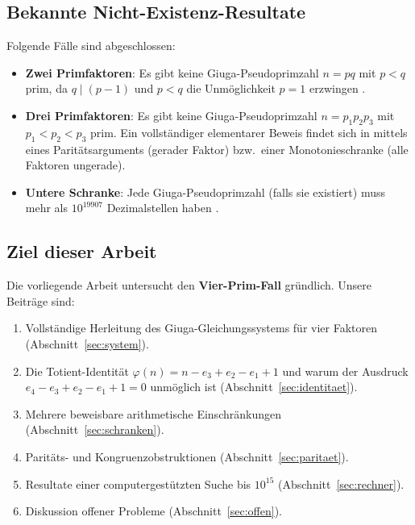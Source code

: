 \documentclass[12pt,a4paper]{amsart}
\theoremstyle{definition}
\begin{document}
\subsection{Bekannte Nicht-Existenz-Resultate}

Folgende Fälle sind abgeschlossen:

\begin{itemize}
  \item \textbf{Zwei Primfaktoren}: Es gibt keine Giuga-Pseudoprimzahl
        $n = pq$ mit $p < q$ prim, da $q \mid (p-1)$ und $p < q$ die
        Unmöglichkeit $p = 1$ erzwingen \cite{Borwein1996}.
  \item \textbf{Drei Primfaktoren}: Es gibt keine Giuga-Pseudoprimzahl
        $n = p_1 p_2 p_3$ mit $p_1 < p_2 < p_3$ prim.  Ein vollständiger
        elementarer Beweis findet sich in \cite{FuhrmannPaper1} mittels
        eines Paritätsarguments (gerader Faktor) bzw.\ einer
        Monotonieschranke (alle Faktoren ungerade).
  \item \textbf{Untere Schranke}: Jede Giuga-Pseudoprimzahl (falls sie
        existiert) muss mehr als $10^{19907}$ Dezimalstellen haben
        \cite{Borwein1996, Tipu2006}.
\end{itemize}

\subsection{Ziel dieser Arbeit}

Die vorliegende Arbeit untersucht den \textbf{Vier-Prim-Fall} gründlich.
Unsere Beiträge sind:
\begin{enumerate}
  \item Vollständige Herleitung des Giuga-Gleichungssystems für vier Faktoren
        (Abschnitt~\ref{sec:system}).
  \item Die Totient-Identität $\varphi(n) = n - e_3 + e_2 - e_1 + 1$ und
        warum der Ausdruck $e_4 - e_3 + e_2 - e_1 + 1 = 0$ unmöglich ist
        (Abschnitt~\ref{sec:identitaet}).
  \item Mehrere beweisbare arithmetische Einschränkungen
        (Abschnitt~\ref{sec:schranken}).
  \item Paritäts- und Kongruenzobstruktionen
        (Abschnitt~\ref{sec:paritaet}).
  \item Resultate einer computergestützten Suche bis $10^{15}$
        (Abschnitt~\ref{sec:rechner}).
  \item Diskussion offener Probleme (Abschnitt~\ref{sec:offen}).
\end{enumerate}
\end{document}

